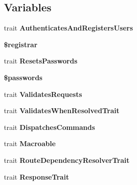 \subsection*{Variables}
\begin{DoxyCompactItemize}
\item 
trait {\bf Authenticates\+And\+Registers\+Users}
\item 
{\bf \$registrar}
\item 
trait {\bf Resets\+Passwords}
\item 
{\bf \$passwords}
\item 
trait {\bf Validates\+Requests}
\item 
trait {\bf Validates\+When\+Resolved\+Trait}
\item 
trait {\bf Dispatches\+Commands}
\item 
trait {\bf Macroable}
\item 
trait {\bf Route\+Dependency\+Resolver\+Trait}
\item 
trait {\bf Response\+Trait}
\end{DoxyCompactItemize}
